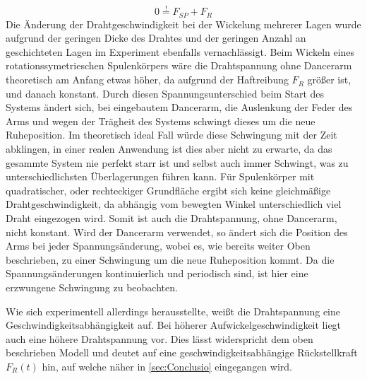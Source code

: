 \begin{equation}
    0 \overset{!}{=}  F_{SP} + F_R
\end{equation}
Die Änderung der Drahtgeschwindigkeit bei der Wickelung mehrerer Lagen wurde aufgrund der geringen Dicke des Drahtes und der geringen Anzahl an geschichteten Lagen im Experiment ebenfalls vernachlässigt.
Beim Wickeln eines rotationssymetrieschen Spulenkörpers wäre die Drahtspannung ohne Dancerarm theoretisch am Anfang etwas höher, da aufgrund der Haftreibung $F_R$ größer ist, und danach konstant. Durch diesen Spannungsunterschied beim Start des Systems ändert sich, bei eingebautem Dancerarm, die Auslenkung der Feder des Arms und wegen der Trägheit des Systems schwingt dieses um die neue Ruheposition. Im theoretisch ideal Fall würde diese Schwingung mit der Zeit abklingen, in einer realen Anwendung ist dies aber nicht zu erwarte, da das gesammte System nie perfekt starr ist und selbst auch immer Schwingt, was zu unterschiedlichsten Überlagerungen führen kann.\newline
Für Spulenkörper mit quadratischer, oder rechteckiger Grundfläche ergibt sich keine gleichmäßige Drahtgeschwindigkeit, da abhängig vom bewegten Winkel unterschiedlich viel Draht eingezogen wird. Somit ist auch die Drahtspannung, ohne Dancerarm, nicht konstant. Wird der Dancerarm verwendet, so ändert sich die Position des Arms bei jeder Spannungsänderung, wobei es, wie bereits weiter Oben beschrieben, zu einer Schwingung um die neue Ruheposition kommt. Da die Spannungsänderungen kontinuierlich und periodisch sind, ist hier eine erzwungene Schwingung zu beobachten.\newline

Wie sich experimentell allerdings herausstellte, weißt die Drahtspannung eine Geschwindigkeitsabhängigkeit auf. Bei höherer Aufwickelgeschwindigkeit liegt auch eine höhere Drahtspannung vor. Dies lässt widerspricht dem oben beschrieben Modell und deutet auf eine geschwindigkeitsabhängige Rückstellkraft $F_{R}(t)$ hin, auf welche näher in \autoref{sec:Conclusio} eingegangen wird.










